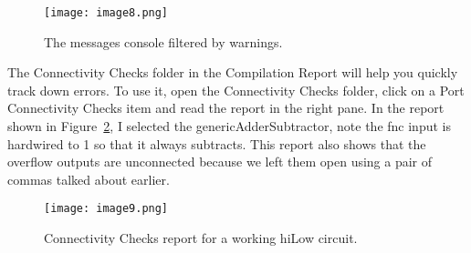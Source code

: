 \begin{figure}[ht]
    \texttt{[image: image8.png]}
    \caption{The messages console filtered by warnings.}
    \label{fig:messageConsole}
\end{figure}

The Connectivity Checks folder in the Compilation Report will help
you quickly track down errors. To use it, open the Connectivity
Checks folder, click on a Port Connectivity Checks item and read the
report in the right pane. In the report shown in Figure~\ref{fig:connectivityCheck}, I selected
the genericAdderSubtractor, note the fnc input is hardwired to 1 so that it
always subtracts. This report also shows that the overflow outputs are
unconnected because we left them open using a pair of commas talked
about earlier.

\begin{figure}[ht]
    \texttt{[image:  image9.png]}
    \caption{Connectivity Checks report for a working hiLow circuit.}
    \label{fig:connectivityCheck}
\end{figure}
